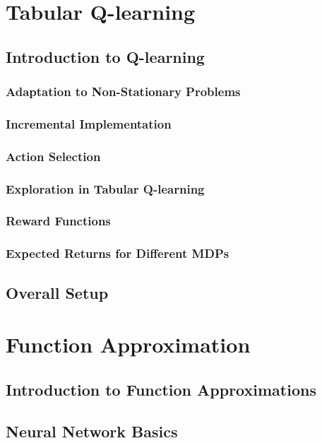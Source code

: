 \section{Tabular Q-learning}
\subsection{Introduction to Q-learning}
\subsubsection{Adaptation to Non-Stationary Problems}
\subsubsection{Incremental Implementation}
\subsubsection{Action Selection}
\subsubsection{Exploration in Tabular Q-learning}
\subsubsection{Reward Functions}
\subsubsection{Expected Returns for Different MDPs}

\subsection{Overall Setup}



\section{Function Approximation}
\subsection{Introduction to Function Approximations}
\subsection{Neural Network Basics}
